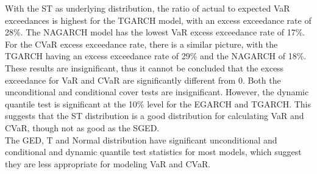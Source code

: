 \documentclass[a4paper, nobind]{templates/ociamthesis}
\begin{document}
\noindent With the ST as underlying distribution, the ratio of actual to expected VaR exceedances is highest for the TGARCH model, with an excess exceedance rate of 28\%. The NAGARCH model has the lowest VaR excess exceedance rate of 17\%. For the CVaR excess exceedance rate, there is a similar picture, with the TGARCH having an excess exceedance rate of 29\% and the NAGARCH of 18\%. These results are insignificant, thus it cannot be concluded that the excess exceedance for VaR and CVaR are significantly different from 0. Both the unconditional and conditional cover tests are insignificant. However, the dynamic quantile test is significant at the 10\% level for the EGARCH and TGARCH. This suggests that the ST distribution is a good distribution for calculating VaR and CVaR, though not as good as the SGED.~\\

\noindent The GED, T and Normal distribution have significant unconditional and conditional and dynamic quantile test statistics for most models, which suggest they are less appropriate for modeling VaR and CVaR.

\newpage
\end{document}
